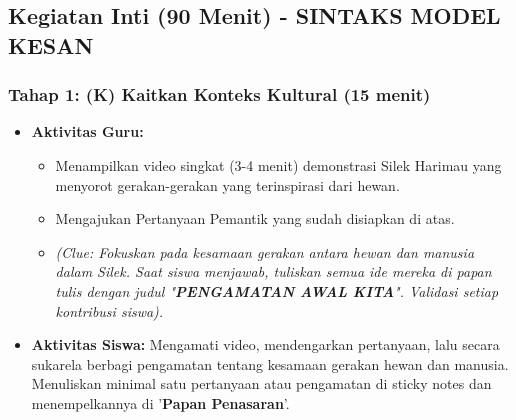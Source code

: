 \documentclass[a4paper,12pt]{article}
\begin{document}
\subsection{Kegiatan Inti (90 Menit) - SINTAKS MODEL KESAN}

\subsubsection{Tahap 1: (K) Kaitkan Konteks Kultural (15 menit)}
\begin{itemize}
\item \textbf{Aktivitas Guru:}
    \begin{itemize}
    \item Menampilkan video singkat (3-4 menit) demonstrasi Silek Harimau yang menyorot gerakan-gerakan yang terinspirasi dari hewan.
    \item Mengajukan Pertanyaan Pemantik yang sudah disiapkan di atas.
    \item \textit{(Clue: Fokuskan pada kesamaan gerakan antara hewan dan manusia dalam Silek. Saat siswa menjawab, tuliskan semua ide mereka di papan tulis dengan judul "\textbf{PENGAMATAN AWAL KITA}". Validasi setiap kontribusi siswa).}
    \end{itemize}
\item \textbf{Aktivitas Siswa:} Mengamati video, mendengarkan pertanyaan, lalu secara sukarela berbagi pengamatan tentang kesamaan gerakan hewan dan manusia. Menuliskan minimal satu pertanyaan atau pengamatan di sticky notes dan menempelkannya di '\textbf{Papan Penasaran}'.
\end{itemize}
\end{document}
